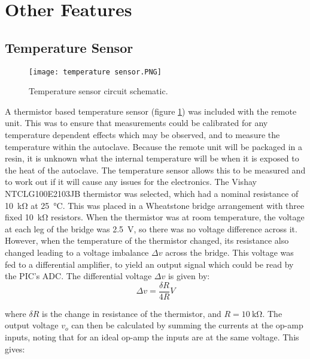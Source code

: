 \section{Other Features}

\subsection{Temperature Sensor}
\begin{figure}[htbp]
	\centering
	\texttt{[image: temperature sensor.PNG]}
	\caption{Temperature sensor circuit schematic.}
	\label{fig: temperature sensor}
\end{figure}

A thermistor based temperature sensor (figure \ref{fig: temperature sensor}) was included with the remote unit. This was to ensure that measurements could be calibrated for any temperature dependent effects which may be observed, and to measure the temperature within the autoclave. Because the remote unit will be packaged in a resin, it is unknown what the internal temperature will be when it is exposed to the heat of the autoclave. The temperature sensor allows this to be measured and to work out if it will cause any issues for the electronics. The Vishay NTCLG100E2103JB \cite{thermistor} thermistor was selected, which had a nominal resistance of \SI{10}{\kilo\ohm} at \SI{25}{\celsius}. This was placed in a Wheatstone bridge arrangement with three fixed \SI{10}{\kilo\ohm} resistors. When the thermistor was at room temperature, the voltage at each leg of the bridge was \SI{2.5}{\volt}, so there was no voltage difference across it. However, when the temperature of the thermistor changed, its resistance also changed leading to a voltage imbalance $\Delta v$ across the bridge. This voltage was fed to a differential amplifier, to yield an output signal which could be read by the PIC's ADC. The differential voltage $\Delta v$ is given by:\\

\begin{equation}
\Delta v = \frac{\delta R}{4 R}V
\end{equation}

where $\delta R$ is the change in resistance of the thermistor, and $R=\SI{10}{\kilo\ohm}$. The output voltage $v_o$ can then be calculated by summing the currents at the op-amp inputs, noting that for an ideal op-amp the inputs are at the same voltage. This gives:\\

